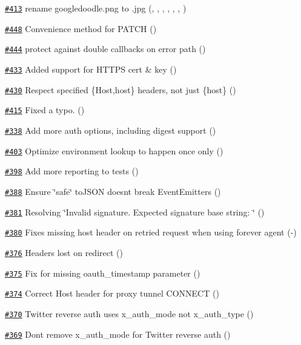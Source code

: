 \begin{DoxyItemize}
\item \href{https://github.com/request/request/pull/413}{\tt \#413} rename googledoodle.\+png to .jpg (, , , , , , )
\item \href{https://github.com/request/request/pull/448}{\tt \#448} Convenience method for P\+A\+T\+CH ()
\item \href{https://github.com/request/request/pull/444}{\tt \#444} protect against double callbacks on error path ()
\item \href{https://github.com/request/request/pull/433}{\tt \#433} Added support for H\+T\+T\+PS cert \& key ()
\item \href{https://github.com/request/request/pull/430}{\tt \#430} Respect specified \{Host,host\} headers, not just \{host\} ()
\item \href{https://github.com/request/request/pull/415}{\tt \#415} Fixed a typo. ()
\item \href{https://github.com/request/request/pull/338}{\tt \#338} Add more auth options, including digest support ()
\item \href{https://github.com/request/request/pull/403}{\tt \#403} Optimize environment lookup to happen once only ()
\item \href{https://github.com/request/request/pull/398}{\tt \#398} Add more reporting to tests ()
\item \href{https://github.com/request/request/pull/388}{\tt \#388} Ensure \char`\"{}safe\char`\"{} to\+J\+S\+ON doesn\textquotesingle{}t break Event\+Emitters ()
\item \href{https://github.com/request/request/pull/381}{\tt \#381} Resolving \char`\"{}\+Invalid signature. Expected signature base string\+: \char`\"{} ()
\item \href{https://github.com/request/request/pull/380}{\tt \#380} Fixes missing host header on retried request when using forever agent (-\/)
\item \href{https://github.com/request/request/pull/376}{\tt \#376} Headers lost on redirect ()
\item \href{https://github.com/request/request/pull/375}{\tt \#375} Fix for missing oauth\+\_\+timestamp parameter ()
\item \href{https://github.com/request/request/pull/374}{\tt \#374} Correct Host header for proxy tunnel C\+O\+N\+N\+E\+CT ()
\item \href{https://github.com/request/request/pull/370}{\tt \#370} Twitter reverse auth uses x\+\_\+auth\+\_\+mode not x\+\_\+auth\+\_\+type ()
\item \href{https://github.com/request/request/pull/369}{\tt \#369} Don\textquotesingle{}t remove x\+\_\+auth\+\_\+mode for Twitter reverse auth ()

\end{DoxyItemize}
